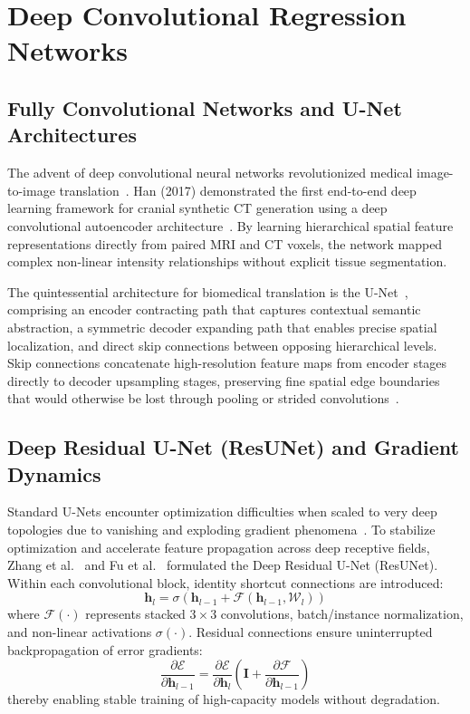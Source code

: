 \section{Deep Convolutional Regression Networks}

\subsection{Fully Convolutional Networks and U-Net Architectures}
The advent of deep convolutional neural networks revolutionized medical image-to-image translation~\cite{ronneberger2015u,han2017mr,nie2016fully}. Han (2017) demonstrated the first end-to-end deep learning framework for cranial synthetic CT generation using a deep convolutional autoencoder architecture~\cite{han2017mr}. By learning hierarchical spatial feature representations directly from paired MRI and CT voxels, the network mapped complex non-linear intensity relationships without explicit tissue segmentation.

The quintessential architecture for biomedical translation is the U-Net~\cite{ronneberger2015u}, comprising an encoder contracting path that captures contextual semantic abstraction, a symmetric decoder expanding path that enables precise spatial localization, and direct skip connections between opposing hierarchical levels. Skip connections concatenate high-resolution feature maps from encoder stages directly to decoder upsampling stages, preserving fine spatial edge boundaries that would otherwise be lost through pooling or strided convolutions~\cite{ronneberger2015u,dinkla2018mr}.

\subsection{Deep Residual U-Net (ResUNet) and Gradient Dynamics}
Standard U-Nets encounter optimization difficulties when scaled to very deep topologies due to vanishing and exploding gradient phenomena~\cite{he2016deep}. To stabilize optimization and accelerate feature propagation across deep receptive fields, Zhang et al.~\cite{zhang2018road} and Fu et al.~\cite{fu2019fast} formulated the Deep Residual U-Net (ResUNet). Within each convolutional block, identity shortcut connections are introduced:
\begin{equation}
\mathbf{h}_{l} = \sigma\left( \mathbf{h}_{l-1} + \mathcal{F}(\mathbf{h}_{l-1}, \mathcal{W}_l) \right)
\label{eq:residual_block}
\end{equation}
where $\mathcal{F}(\cdot)$ represents stacked $3\times3$ convolutions, batch/instance normalization, and non-linear activations $\sigma(\cdot)$. Residual connections ensure uninterrupted backpropagation of error gradients:
\begin{equation}
\frac{\partial \mathcal{E}}{\partial \mathbf{h}_{l-1}} = \frac{\partial \mathcal{E}}{\partial \mathbf{h}_{l}} \left( \mathbf{I} + \frac{\partial \mathcal{F}}{\partial \mathbf{h}_{l-1}} \right)
\label{eq:res_gradient}
\end{equation}
thereby enabling stable training of high-capacity models without degradation.

